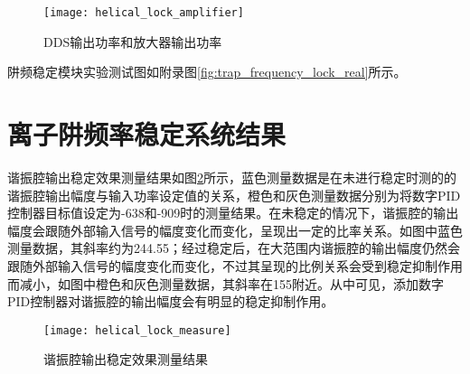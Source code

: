 \begin{figure}
    \centering
    \caption[DDS输出功率和放大器输出功率]{DDS输出功率和放大器输出功率\label{fig:helical_lock_amplifier}}
    \texttt{[image: helical\_lock\_amplifier]}
\end{figure}

阱频稳定模块实验测试图如附录图\ref{fig:trap_frequency_lock_real}所示。

\section[离子阱频率稳定系统结果]{离子阱频率稳定系统结果}

谐振腔输出稳定效果测量结果如图\ref{fig:helical_lock_measure}所示，蓝色测量数据是在未进行稳定时测的的谐振腔输出幅度与输入功率设定值的关系，橙色和灰色测量数据分别为将数字PID控制器目标值设定为-638和-909时的测量结果。在未稳定的情况下，谐振腔的输出幅度会跟随外部输入信号的幅度变化而变化，呈现出一定的比率关系。如图中蓝色测量数据，其斜率约为244.55；经过稳定后，在大范围内谐振腔的输出幅度仍然会跟随外部输入信号的幅度变化而变化，不过其呈现的比例关系会受到稳定抑制作用而减小，如图中橙色和灰色测量数据，其斜率在155附近。从中可见，添加数字PID控制器对谐振腔的输出幅度会有明显的稳定抑制作用。

\begin{figure}
    \centering
    \caption[谐振腔输出稳定效果测量结果]{谐振腔输出稳定效果测量结果\label{fig:helical_lock_measure}}
    \texttt{[image: helical\_lock\_measure]}
\end{figure}


